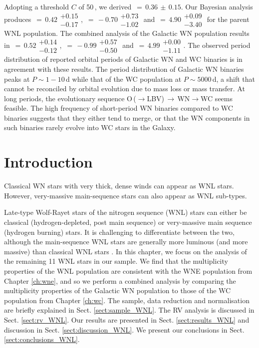 \begin{abs}
Adopting a threshold $C$ of 50\,\kms{}, we derived \fobsWNL{}$\,=\,0.36\,\pm\,0.15$. Our Bayesian analysis produces \fintWNL{}$\,=\,0.42\substack{+0.15 \\ -0.17}$, \piWNL{}$\,=\,-0.70\substack{+0.73 \\ -1.02}$ and \logPmaxWNL$\,=\,4.90\substack{+0.09 \\ -3.40}$ for the parent WNL population. The combined analysis of the Galactic WN population results in \fintWN{}$\,=\,0.52\substack{+0.14 \\ -0.12}$, \piWN{}$\,=\,-0.99\substack{+0.57 \\ -0.50}$ and \logPmaxWN$\,=\,4.99\substack{+0.00 \\ -1.11}$. The observed period distribution of reported orbital periods of Galactic WN and WC binaries is in agreement with these results.
The period distribution of Galactic WN binaries peaks at $P{\sim}1-10\,$d while that of the WC population at $P{\sim}5000\,$d, a shift that cannot be reconciled by orbital evolution due to mass loss or mass transfer.
At long periods, the evolutionary sequence O\,($\xrightarrow{}$LBV)\,$\xrightarrow{}$\,WN$\xrightarrow{}$WC seems feasible. The high frequency of short-period WN binaries compared to WC binaries suggests that they either tend to merge, or that the WN components in such binaries rarely evolve into WC stars in the Galaxy.
\end{abs}


\section{Introduction}

Classical WN stars with very thick, dense winds can appear as WNL stars. However, very-massive main-sequence stars can also appear as WNL sub-types. 

Late-type Wolf-Rayet stars of the nitrogen sequence (WNL) stars can either be classical (hydrogen-depleted, post main sequence) or very-massive main sequence (hydrogen burning) stars. It is challenging to differentiate between the two, although the main-sequence WNL stars are generally more luminous (and more massive) than classical WNL stars \citep{hamann_galactic_2019}. In this chapter, we focus on the analysis of the remaining 11 WNL stars in our sample. We find that the multiplicity properties of the WNL population are consistent with the WNE population from Chapter \ref{ch:wne}, and so we perform a combined analysis by comparing the multiplicity properties of the Galactic WN population to those of the WC population from Chapter \ref{ch:wc}. The sample, data reduction and normalisation are briefly explained in Sect. \ref{sect:sample_WNL}. The RV analysis is discussed in Sect. \ref{sect:rv_WNL}. Our results are presented in Sect. \ref{sect:results_WNL} and discussion in Sect. \ref{sect:discussion_WNL}. We present our conclusions in Sect. \ref{sect:conclusions_WNL}. 


